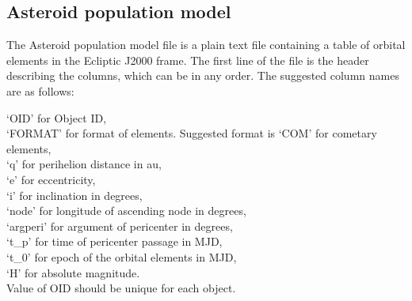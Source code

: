 \documentclass[10pt,a4paper]{article}
\begin{document}
\subsection{Asteroid population model}
The Asteroid population model file is a plain text file containing a
table of orbital elements in the Ecliptic J2000 frame. The first line
of the file is the header describing the columns,  which can be
in any order. The suggested column names are as follows:

`OID' for Object ID,\\
`FORMAT' for format of elements. Suggested format is `COM' for cometary elements,\\
`q' for perihelion distance in au,\\
`e' for eccentricity,\\
`i' for inclination in degrees,\\
`node' for longitude of ascending node in degrees,\\
`argperi' for argument of pericenter in degrees,\\
`t\_p' for time of pericenter passage in MJD,\\
`t\_0' for epoch of the orbital elements in MJD,\\
`H' for absolute magnitude.\\

Value of OID should be unique for each object.


\newpage


\end{document}

